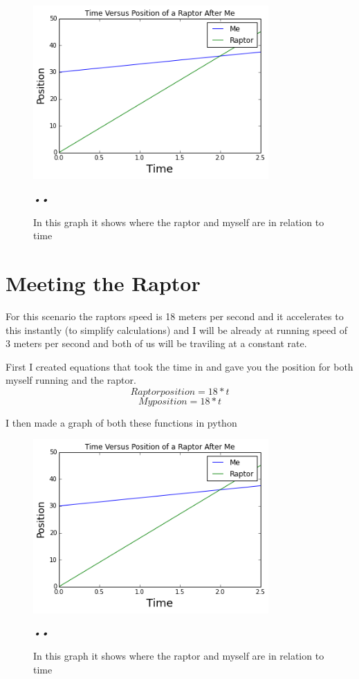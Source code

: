 \documentclass[twocolumn]{revtex4}
\begin{document}
\begin{figure}[h]
  \includegraphics[width=90mm]{graph1.png}
  \caption{In this graph it shows where the raptor and myself are in relation to time}
\textit{\textit{•\textbf{•}}}  \label{fig:graph1}
\end{figure}


\section{Meeting the Raptor}
For this scenario the raptors speed is 18 meters per second and it accelerates to this instantly (to simplify calculations) and I will be already at running speed of 3 meters per second and both of us will be traviling at a constant rate.

First I created equations that took the time in and gave you the position for both myself running and the raptor.
$$Raptorposition= 18*t$$ $$My  position= 18*t$$
    
I then made a graph of both these functions in python
    
\begin{figure}[h]
  \includegraphics[width=90mm]{graph1.png}
  \caption{In this graph it shows where the raptor and myself are in relation to time}
\textit{\textit{•\textbf{•}}}  \label{fig:graph1}
\end{figure}
\end{document}
